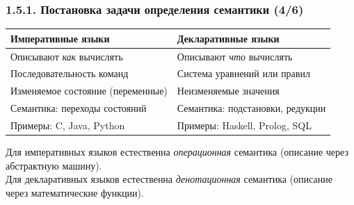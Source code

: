 \begin{frame}
\frametitle{1.5.1. Постановка задачи определения семантики (4/6)}


\medskip
\begin{tabular}{|p{65mm}|p{65mm}|}
\hline
\textbf{Императивные языки} & \textbf{Декларативные языки} \\
\hline
Описывают \emph{как} вычислять & Описывают \emph{что} вычислять \\
\hline
Последовательность команд & Система уравнений или правил \\
\hline
Изменяемое состояние (переменные) & Неизменяемые значения \\
\hline
Семантика: переходы состояний & Семантика: подстановки, редукции \\
\hline
Примеры: C, Java, Python & Примеры: Haskell, Prolog, SQL \\
\hline
\end{tabular}

\begin{remark}
Для императивных языков естественна \emph{операционная} семантика 
(описание через абстрактную машину).\\
Для декларативных языков естественна \emph{денотационная} семантика 
(описание через математические функции).
\end{remark}

\end{frame}



